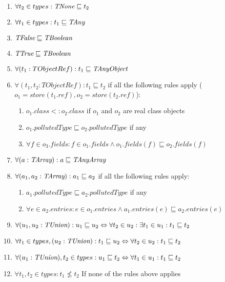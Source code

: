 \documentclass[a4paper]{article}
\begin{document}
\begin{enumerate}
  \item $\forall t_2 \in types : \emph{TNone} \sqsubseteq t_2$
  \item $\forall t_1 \in types : t_1 \sqsubseteq \emph{TAny}$
  \item $\emph{TFalse} \sqsubseteq \emph{TBoolean}$
  \item $\emph{TTrue} \sqsubseteq \emph{TBoolean}$
  \item $\forall (t_1:  TObjectRef): t_1 \sqsubseteq \emph{TAnyObject}$
  \item $\forall (t_1,t_2: TObjectRef): t_1 \sqsubseteq t_2$
    if all the following rules apply ($o_1 = store(t_1.ref), o_2 = store(t_2.ref)$):
    \begin{enumerate}
        \item $o_1.class <: o_2.class$ if $o_1$ and $o_2$ are real class objects
        \item $o_1.pollutedType \sqsubseteq o_2.pollutedType$ if any
        \item $\forall f \in o_3.fields: f \in o_1.fields \wedge o_1.fields(f)
          \sqsubseteq o_2.fields(f)$
    \end{enumerate}
  \item $\forall (a: \emph{TArray}) : a \sqsubseteq \emph{TAnyArray}$
  \item $\forall (a_1,a_2: \emph{TArray}) : a_1 \sqsubseteq a_2$
    if all the following rules apply:
    \begin{enumerate}
        \item $a_1.pollutedType \sqsubseteq a_2.pollutedType$ if any
        \item $\forall e \in a_2.entries: e \in o_1.entries \wedge a_1.entries(e)
          \sqsubseteq a_2.entries(e)$
    \end{enumerate}
  \item $\forall (u_1,u_2: \emph{TUnion}) : u_1 \sqsubseteq u_2 \Leftrightarrow \forall t_2 \in u_2: \exists t_1 \in u_1: t_1 \sqsubseteq t_2$
  \item $\forall t_1 \in types, (u_2: \emph{TUnion}) : t_1 \sqsubseteq u_2 \Leftrightarrow \forall t_2 \in u_2: t_1 \sqsubseteq t_2$
  \item $\forall (u_1: \emph{TUnion}), t_2 \in types : u_1 \sqsubseteq t_2 \Leftrightarrow \forall t_1 \in u_1: t_1 \sqsubseteq t_2$
  \item $\forall t_1,t_2 \in types : t_1 \nleq t_2$ If none of the rules above applies
\end{enumerate}
\end{document}
